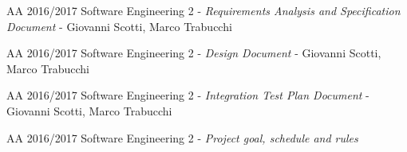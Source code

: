\begin{thebibliography}{9}

	AA 2016/2017 Software Engineering 2 - \emph{Requirements Analysis and Specification Document} - Giovanni Scotti, Marco Trabucchi

	AA 2016/2017 Software Engineering 2 - \emph{Design Document} - Giovanni Scotti, Marco Trabucchi

	AA 2016/2017 Software Engineering 2 - \emph{Integration Test Plan Document} - Giovanni Scotti, Marco Trabucchi
	
	AA 2016/2017 Software Engineering 2 - \emph{Project goal, schedule and rules}

\end{thebibliography}